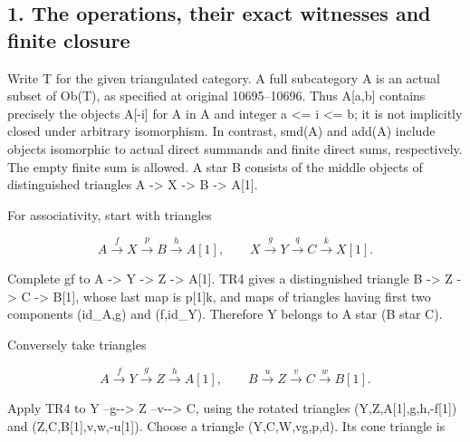 \documentclass[11pt]{article}
\begin{document}
\subsection{\texorpdfstring{1. The operations,\allowbreak{} their exact witnesses and finite closure}{1. The  their exact witnesses and finite closure}}\label{proofs-10691-11108-the-operations-their-exact-witnesses-and-finite-closure}

Write T for the given triangulated category. A full subcategory A is an actual subset of Ob(T)\allowbreak{},\allowbreak{} as specified at original 10695–\allowbreak{}10696. Thus A[a,\allowbreak{}b]\allowbreak{} contains precisely the objects A[-i]\allowbreak{} for A in A and integer a <\allowbreak{}= i <\allowbreak{}= b; it is not implicitly closed under arbitrary isomorphism. In contrast,\allowbreak{} smd(A)\allowbreak{} and add(A)\allowbreak{} include objects isomorphic to actual direct summands and finite direct sums,\allowbreak{} respectively. The empty finite sum is allowed. A star B consists of the middle objects of distinguished triangles A \allowbreak{}-> X \allowbreak{}-> B \allowbreak{}-> A[1]\allowbreak{}.

For associativity,\allowbreak{} start with triangles

\[
 A\xrightarrow f X\xrightarrow p B\xrightarrow h A[1],
 \qquad X\xrightarrow g Y\xrightarrow q C\xrightarrow k X[1].
\]

Complete gf to A \allowbreak{}-> Y \allowbreak{}-> Z \allowbreak{}-> A[1]\allowbreak{}. TR4 gives a distinguished triangle B \allowbreak{}-> Z \allowbreak{}-> C \allowbreak{}-> B[1]\allowbreak{},\allowbreak{} whose last map is p[1]\allowbreak{}k,\allowbreak{} and maps of triangles having first two components (id\_\allowbreak{}A,\allowbreak{}g)\allowbreak{} and (f,\allowbreak{}id\_\allowbreak{}Y)\allowbreak{}. Therefore Y belongs to A star (B star C)\allowbreak{}.

Conversely take triangles

\[
 A\xrightarrow f Y\xrightarrow g Z\xrightarrow h A[1],
 \qquad B\xrightarrow u Z\xrightarrow v C\xrightarrow w B[1].
\]

Apply TR4 to Y --g-\allowbreak{}-> Z --v-\allowbreak{}-> C,\allowbreak{} using the rotated triangles (Y,\allowbreak{}Z,\allowbreak{}A[1]\allowbreak{},\allowbreak{}g,\allowbreak{}h,\allowbreak{}-f[1]\allowbreak{})\allowbreak{} and (Z,\allowbreak{}C,\allowbreak{}B[1]\allowbreak{},\allowbreak{}v,\allowbreak{}w,\allowbreak{}-u[1]\allowbreak{})\allowbreak{}. Choose a triangle (Y,\allowbreak{}C,\allowbreak{}W,\allowbreak{}vg,\allowbreak{}p,\allowbreak{}d)\allowbreak{}. Its cone triangle is
\end{document}
